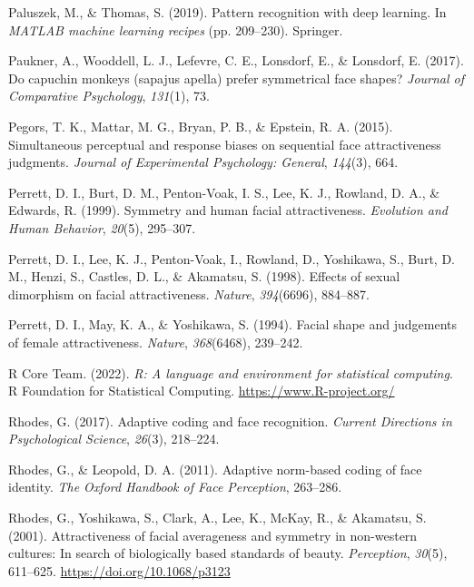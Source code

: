 \documentclass[
  doc,floatsintext]{apa6}
\newlength{\cslhangindent}
\newlength{\cslentryspacingunit} %
\newenvironment{CSLReferences}[2] %
 {%
  \setlength{\parindent}{0pt}
  \ifodd #1
  \let\oldpar\par
  \def\par{\hangindent=\cslhangindent\oldpar}
  \fi
  \setlength{\parskip}{#2\cslentryspacingunit}
 }%
 {}
\begin{document}
\begin{CSLReferences}{1}{0}
\leavevmode{}%
Paluszek, M., \& Thomas, S. (2019). Pattern recognition with deep learning. In \emph{MATLAB machine learning recipes} (pp. 209--230). Springer.

\leavevmode{}%
Paukner, A., Wooddell, L. J., Lefevre, C. E., Lonsdorf, E., \& Lonsdorf, E. (2017). Do capuchin monkeys (sapajus apella) prefer symmetrical face shapes? \emph{Journal of Comparative Psychology}, \emph{131}(1), 73.

\leavevmode{}%
Pegors, T. K., Mattar, M. G., Bryan, P. B., \& Epstein, R. A. (2015). Simultaneous perceptual and response biases on sequential face attractiveness judgments. \emph{Journal of Experimental Psychology: General}, \emph{144}(3), 664.

\leavevmode{}%
Perrett, D. I., Burt, D. M., Penton-Voak, I. S., Lee, K. J., Rowland, D. A., \& Edwards, R. (1999). Symmetry and human facial attractiveness. \emph{Evolution and Human Behavior}, \emph{20}(5), 295--307.

\leavevmode{}%
Perrett, D. I., Lee, K. J., Penton-Voak, I., Rowland, D., Yoshikawa, S., Burt, D. M., Henzi, S., Castles, D. L., \& Akamatsu, S. (1998). Effects of sexual dimorphism on facial attractiveness. \emph{Nature}, \emph{394}(6696), 884--887.

\leavevmode{}%
Perrett, D. I., May, K. A., \& Yoshikawa, S. (1994). Facial shape and judgements of female attractiveness. \emph{Nature}, \emph{368}(6468), 239--242.

\leavevmode{}%
R Core Team. (2022). \emph{R: A language and environment for statistical computing}. R Foundation for Statistical Computing. \url{https://www.R-project.org/}

\leavevmode{}%
Rhodes, G. (2017). Adaptive coding and face recognition. \emph{Current Directions in Psychological Science}, \emph{26}(3), 218--224.

\leavevmode{}%
Rhodes, G., \& Leopold, D. A. (2011). Adaptive norm-based coding of face identity. \emph{The Oxford Handbook of Face Perception}, 263--286.

\leavevmode{}%
Rhodes, G., Yoshikawa, S., Clark, A., Lee, K., McKay, R., \& Akamatsu, S. (2001). Attractiveness of facial averageness and symmetry in non-western cultures: In search of biologically based standards of beauty. \emph{Perception}, \emph{30}(5), 611--625. \url{https://doi.org/10.1068/p3123}


\end{CSLReferences}
\end{document}
